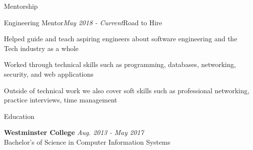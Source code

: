 \documentclass{resume} %
\begin{document}
\begin{rSection}{\vspace{-5pt}Mentorship}
  \begin{rSubsection}{Engineering Mentor}{\em May 2018 - Current}{Road to Hire}{}
  \item {Helped guide and teach aspiring engineers about software engineering and the Tech industry as a whole}
  \item {Worked through technical skills such as programming, databases, networking, security, and web applications}
  \item {Outside of technical work we also cover soft skills such as professional networking, practice interviews, time management}
  \end{rSubsection}
\end{rSection}




\begin{rSection}{\vspace{-5pt}Education}

  {\bf Westminster College} \hfill {\em Aug. 2013 - May 2017} 
  \\ Bachelor's of Science in Computer Information Systems


\end{rSection}
\end{document}
